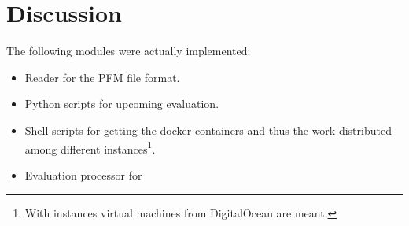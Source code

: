 \section{Discussion}


The following modules were actually implemented:

\begin{itemize}
  \item Reader for the PFM file format.
  \item Python scripts for upcoming evaluation.
  \item Shell scripts for getting the docker containers and thus the work distributed among different instances\footnote{With instances virtual machines from DigitalOcean are meant.}.
  \item Evaluation processor for
\end{itemize}
